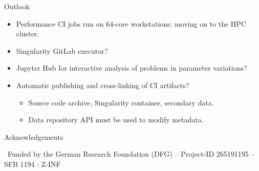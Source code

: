 \documentclass[
	aspectratio=169,%
	color={accentcolor=2d},
	logo=true,%
	colorframetitle=true,%
	]{tudabeamer}
\begin{document}
\begin{frame}{Outlook}
	\vfill
	\begin{itemize}
            \item Performance CI jobs run on 64-core workstations: moving on to the HPC cluster. 
            \item Singularity GitLab executor? 
            \item Jupyter Hub for interactive analysis of problems in parameter variations?
            \item Automatic publishing and cross-linking of CI artifacts? 
                \begin{itemize}
                    \item Source code archive, Singularity container, secondary data. 
                    \item Data repository API must be used to modify metadata. 
                \end{itemize}
	\end{itemize}
\end{frame}

\begin{frame}{Acknowledgements}

	\vfill
	{\
		Funded by the German Research Foundation (DFG) – Project-ID 265191195 – SFB 1194 : Z-INF
	}

\end{frame}
\end{document}
